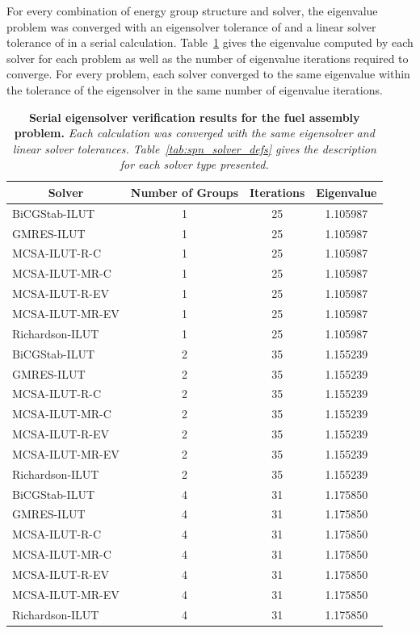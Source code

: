 For every combination of energy group structure and solver, the
eigenvalue problem was converged with an eigensolver tolerance of
 and a linear solver tolerance of  in a serial
calculation. Table~\ref{tab:serial_ev_results} gives the eigenvalue
computed by each solver for each problem as well as the number of
eigenvalue iterations required to converge. For every problem, each
solver converged to the same eigenvalue within the tolerance of the
eigensolver in the same number of eigenvalue iterations.
\begin{table}[h!]
  \begin{center}
    \begin{tabular}{lccc}\hline\hline
      \multicolumn{1}{c}{\textbf{Solver}} & 
      \multicolumn{1}{c}{\textbf{Number of Groups}} & 
      \multicolumn{1}{c}{\textbf{Iterations}} &
      \multicolumn{1}{c}{\textbf{Eigenvalue}} \\
      \hline
      BiCGStab-ILUT & 1 & 25 & 1.105987 \\
      GMRES-ILUT & 1 & 25 & 1.105987 \\
      MCSA-ILUT-R-C & 1 & 25 & 1.105987 \\
      MCSA-ILUT-MR-C & 1 & 25 & 1.105987 \\
      MCSA-ILUT-R-EV & 1 & 25 & 1.105987 \\
      MCSA-ILUT-MR-EV & 1 & 25 & 1.105987 \\
      Richardson-ILUT & 1 & 25 & 1.105987 \\
      \hline
      BiCGStab-ILUT & 2 & 35 & 1.155239 \\
      GMRES-ILUT & 2 & 35 & 1.155239 \\
      MCSA-ILUT-R-C & 2 & 35 & 1.155239 \\
      MCSA-ILUT-MR-C & 2 & 35 & 1.155239 \\
      MCSA-ILUT-R-EV & 2 & 35 & 1.155239 \\
      MCSA-ILUT-MR-EV & 2 & 35 & 1.155239 \\
      Richardson-ILUT & 2 & 35 & 1.155239 \\
      \hline
      BiCGStab-ILUT & 4 & 31 & 1.175850 \\
      GMRES-ILUT & 4 & 31 & 1.175850 \\
      MCSA-ILUT-R-C & 4 & 31 & 1.175850 \\
      MCSA-ILUT-MR-C & 4 & 31 & 1.175850 \\
      MCSA-ILUT-R-EV & 4 & 31 & 1.175850 \\
      MCSA-ILUT-MR-EV & 4 & 31 & 1.175850 \\
      Richardson-ILUT & 4 & 31 & 1.175850 \\
      \hline\hline
    \end{tabular}
  \end{center}
  \caption{\textbf{Serial eigensolver verification results for the
      fuel assembly problem.} \textit{Each calculation was converged
      with the same eigensolver and linear solver
      tolerances. Table~\ref{tab:spn_solver_defs} gives the
      description for each solver type presented.}}
  \label{tab:serial_ev_results}
\end{table}

